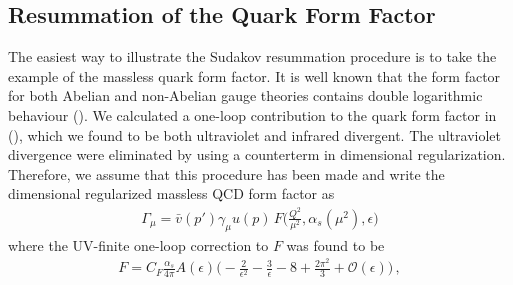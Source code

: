\subsection{Resummation of the Quark Form Factor}\label{sec:Resummation Quark Form Factor}
The easiest way to illustrate the Sudakov resummation procedure is to take the example of the massless quark form factor. It is well known that the form factor for both Abelian and non-Abelian gauge theories contains double logarithmic behaviour (). We calculated a one-loop contribution to the quark form factor in (), which we found to be both ultraviolet and infrared divergent. The ultraviolet divergence were eliminated by using a counterterm in dimensional regularization. Therefore, we assume that this procedure has been made and write the dimensional regularized massless QCD form factor as
\begin{align}
    \Gamma_{\mu}=\bar{v}(p')\gamma_{\mu}u(p)\,F\Big(\frac{Q^{2}}{\mu^{2}},\alpha_{s}(\mu^{2}),\epsilon\Big)
\end{align}
where the UV-finite one-loop correction to $F$ was found to be
\begin{align}
    F=C_{F}\frac{\alpha_s}{4\pi}A(\epsilon)\Big(-\frac{2}{\epsilon^{2}}-\frac{3}{\epsilon}-8+\frac{2\pi^{2}}{3}+\mathcal{O}(\epsilon)\Big)\,,
\end{align}


